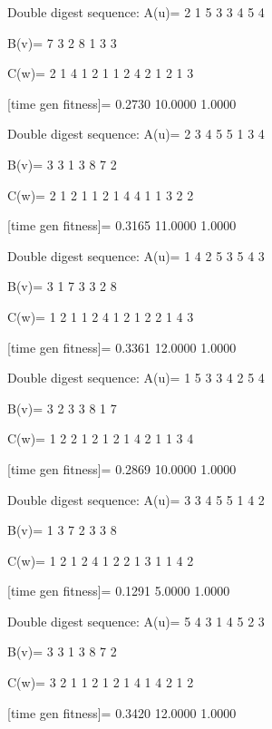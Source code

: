 Double digest sequence:
A(u)=
     2     1     5     3     3     4     5     4

B(v)=
     7     3     2     8     1     3     3

C(w)=
     2     1     4     1     2     1     1     2     4     2     1     2     1     3

[time gen fitness]=
    0.2730   10.0000    1.0000

Double digest sequence:
A(u)=
     2     3     4     5     5     1     3     4

B(v)=
     3     3     1     3     8     7     2

C(w)=
     2     1     2     1     1     2     1     4     4     1     1     3     2     2

[time gen fitness]=
    0.3165   11.0000    1.0000

Double digest sequence:
A(u)=
     1     4     2     5     3     5     4     3

B(v)=
     3     1     7     3     3     2     8

C(w)=
     1     2     1     1     2     4     1     2     1     2     2     1     4     3

[time gen fitness]=
    0.3361   12.0000    1.0000

Double digest sequence:
A(u)=
     1     5     3     3     4     2     5     4

B(v)=
     3     2     3     3     8     1     7

C(w)=
     1     2     2     1     2     1     2     1     4     2     1     1     3     4

[time gen fitness]=
    0.2869   10.0000    1.0000

Double digest sequence:
A(u)=
     3     3     4     5     5     1     4     2

B(v)=
     1     3     7     2     3     3     8

C(w)=
     1     2     1     2     4     1     2     2     1     3     1     1     4     2

[time gen fitness]=
    0.1291    5.0000    1.0000

Double digest sequence:
A(u)=
     5     4     3     1     4     5     2     3

B(v)=
     3     3     1     3     8     7     2

C(w)=
     3     2     1     1     2     1     2     1     4     1     4     2     1     2

[time gen fitness]=
    0.3420   12.0000    1.0000

